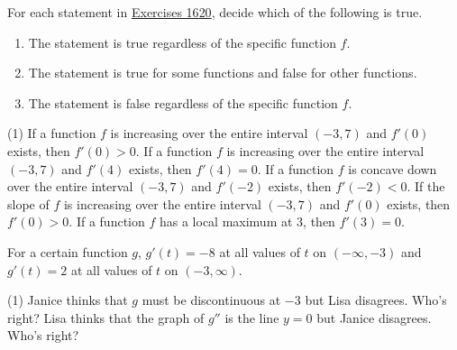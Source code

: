 \documentclass[12pt,]{book}
\newcommand{\lt}{<}
\newcommand{\gt}{>}
\theoremstyle{plain}
\theoremstyle{definition}
\numberwithin{equation}{section}
\newcommand{\fe}[2]{#1\mathopen{}\left(#2\right)\mathclose{}}
\newcommand{\ointerval}[2]{\left(#1,#2\right)}
\newcommand{\fd}[1]{#1'}
\newcommand{\sd}[1]{#1''}
\begin{document}
\hypertarget{exercisegroup-66}{\null}For each statement in \hyperlink{exercise-function-statement-first}{Exercises 16}\textendash{}\hyperlink{exercise-function-statement-last}{20}, decide which of the following is true. %
\begin{multicols}{3}
\begin{enumerate}[label=(\alph*)]
\item{}The statement is true regardless of the specific function \(f\).\item{}The statement is true for some functions and false for other functions. \item{}The statement is false regardless of the specific function \(f\).\end{enumerate}
\end{multicols}
\par
\begin{exercisegroup}(1)
\exercise[16.]\hypertarget{exercise-function-statement-first}{\null}If a function \(f\) is increasing over the entire interval \(\ointerval{-3}{7}\) and \(\fe{\fd{f}}{0}\) exists, then \(\fe{\fd{f}}{0}\gt0\).%
\exercise[17.]\hypertarget{exercise-314}{\null}If a function \(f\) is increasing over the entire interval \(\ointerval{-3}{7}\) and \(\fe{\fd{f}}{4}\) exists, then \(\fe{\fd{f}}{4}=0\).%
\exercise[18.]\hypertarget{exercise-315}{\null}If a function \(f\) is concave down over the entire interval \(\ointerval{-3}{7}\) and \(\fe{\fd{f}}{-2}\) exists, then \(\fe{\fd{f}}{-2}\lt0\).%
\exercise[19.]\hypertarget{exercise-316}{\null}If the slope of \(f\) is increasing over the entire interval \(\ointerval{-3}{7}\) and \(\fe{\fd{f}}{0}\) exists, then \(\fe{\fd{f}}{0}\gt0\).%
\exercise[20.]\hypertarget{exercise-function-statement-last}{\null}If a function \(f\) has a local maximum at \(3\), then \(\fe{\fd{f}}{3}=0\).%
\end{exercisegroup}
\par\smallskip\noindent
\hypertarget{exercisegroup-67}{\null}For a certain function \(g\), \(\fe{\fd{g}}{t}=-8\) at all values of \(t\) on \(\ointerval{-\infty}{-3}\) and \(\fe{\fd{g}}{t}=2\) at all values of \(t\) on \(\ointerval{-3}{\infty}\).%
\par
\begin{exercisegroup}(1)
\exercise[21.]\hypertarget{exercise-318}{\null}Janice thinks that \(g\) must be discontinuous at \(-3\) but Lisa disagrees.  Who's right?%
\exercise[22.]\hypertarget{exercise-319}{\null}Lisa thinks that the graph of \(\sd{g}\) is the line \(y=0\) but Janice disagrees.  Who's right?%
\end{exercisegroup}
\end{document}
